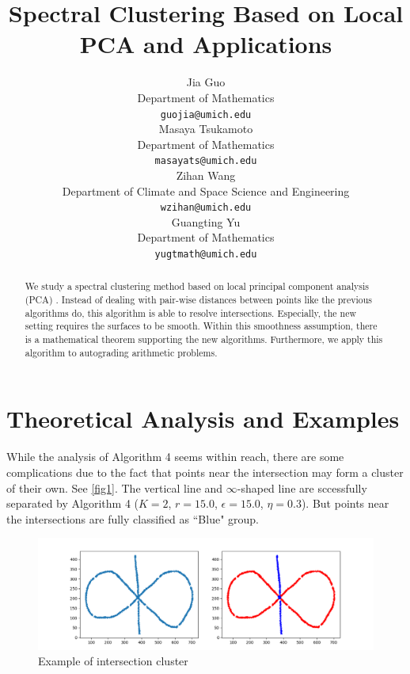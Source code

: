 \documentclass{article}
\title{Spectral Clustering Based on Local PCA and Applications}
\author{%
  Jia Guo \\
  Department of Mathematics\\
  \texttt{guojia@umich.edu} \\
   \AND
    Masaya Tsukamoto\\
   Department of Mathematics\\
   \texttt{masayats@umich.edu} \\
   \AND
   Zihan Wang \\
   Department of Climate and Space Science and Engineering\\
   \texttt{wzihan@umich.edu} \\
   \AND
   Guangting Yu \\
   Department of Mathematics \\
   \texttt{yugtmath@umich.edu} \\
}
\begin{document}
\maketitle

\begin{abstract}
We study a spectral clustering method based on local principal component analysis (PCA) \citep{arias2017}.
Instead of dealing with pair-wise distances between points like the previous algorithms do, this algorithm is able to resolve intersections.
Especially, the new setting requires the surfaces to be smooth.
Within this smoothness assumption, there is a mathematical theorem supporting the new algorithms.
Furthermore, we apply this algorithm to autograding arithmetic problems.
\end{abstract}




\section{Theoretical Analysis and Examples}
While the analysis of Algorithm 4 seems within reach, there are some complications due to the fact that points near the intersection may form a cluster of their own.
See \autoref{fig1}.
The vertical line and $\infty$-shaped line are sccessfully separated by Algorithm 4 ($K = 2$, $r = 15.0$, $\epsilon = 15.0$, $\eta = 0.3$).
But points near the intersections are fully classified as ``Blue" group. 
\begin{figure}[htbp]
\centering
\vspace{-1em}
\includegraphics[width=0.9 \textwidth]{infinity_shape.png}
\vspace{-1em}
\caption{Example of intersection cluster}
\label{fig1}
\end{figure}
\end{document}
